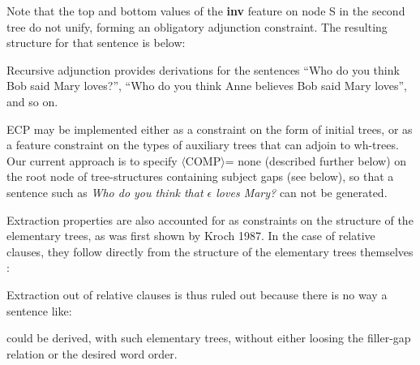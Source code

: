 Note that the top and bottom values of the {\bf inv} feature
on node S in the second tree do not unify,
forming an obligatory adjunction constraint.
The resulting structure for that sentence is below:




Recursive adjunction provides derivations for the sentences
``Who do you think Bob said Mary loves?'', ``Who do you think Anne believes Bob said Mary loves'', and so on.



ECP may be implemented either as a constraint on the form of initial
trees, or as a feature constraint on the types of auxiliary trees that
can adjoin to wh-trees. Our current approach is to specify $\langle$COMP$\rangle$= none 
(described further below) on the root node of 
tree-structures containing subject gaps (see below),
so that a sentence such as {\it  *Who do you think that $\epsilon$ loves Mary?}
can not be generated. 




Extraction properties are also accounted for as  constraints on the structure of the elementary trees, as was first shown by Kroch 1987\nocite{k87}. 
In the case of relative clauses, they follow directly from the structure of the 
elementary trees themselves :


Extraction out of relative clauses is thus ruled out because there is no way a sentence like:

\beginsentences
{}

\endsentences

\noindent could  be derived, with such elementary trees, without either loosing the filler-gap relation
or the desired word order.

